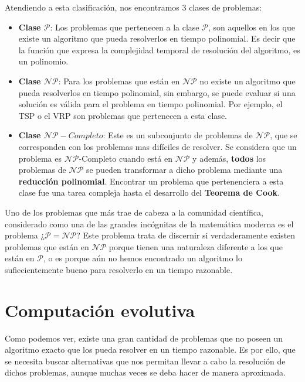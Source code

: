 Atendiendo a esta clasificación, nos encontramos 3 clases de problemas:

\begin{itemize}
    \item \textbf{Clase $\mathcal{P}$}: Los problemas que pertenecen a la clase $\mathcal{P}$, son aquellos en los que existe un algoritmo que pueda resolverlos en tiempo polinomial. Es decir que la función que expresa la complejidad temporal de resolución del algoritmo, es un polinomio.
    \item \textbf{Clase $\mathcal{NP}$}: Para los problemas que están en $\mathcal{NP}$ no existe un algoritmo que pueda resolverlos en tiempo polinomial, sin embargo, se puede evaluar si una solución es válida para el problema en tiempo polinomial. Por ejemplo, el TSP o el VRP son problemas que pertenecen a esta clase.
    \item \textbf{Clase $\mathcal{NP}-Completo$}: Este es un subconjunto de problemas de $\mathcal{NP}$, que se corresponden con los problemas mas difíciles de resolver. Se considera que un problema es $\mathcal{NP}$-Completo cuando está en $\mathcal{NP}$ y además, \textbf{todos} los problemas de $\mathcal{NP}$ se pueden transformar a dicho problema mediante una \textbf{reducción polinomial}. Encontrar un problema que pertenenciera a esta clase fue una tarea compleja hasta el desarrollo del \textbf{Teorema de Cook}.
\end{itemize}

Uno de los problemas que más trae de cabeza a la comunidad científica, considerado como una de las grandes incógnitas de la matemática moderna es el problema ¿$\mathcal{P} = \mathcal{NP}$? Este problema trata de discernir si verdaderamente existen problemas que están en $\mathcal{NP}$ porque tienen una naturaleza diferente a los que están en $\mathcal{P}$, o es porque aún no hemos encontrado un algoritmo lo sufiecientemente bueno para resolverlo en un tiempo razonable.

\section{Computación evolutiva}
\label{1:sec:2}

Como podemos ver, existe una gran cantidad de problemas que no poseen un algoritmo exacto que los pueda resolver en un tiempo razonable. Es por ello, que se necesita buscar alternativas que nos permitan llevar a cabo la resolución de dichos problemas, aunque muchas veces se deba hacer de manera aproximada. \\

